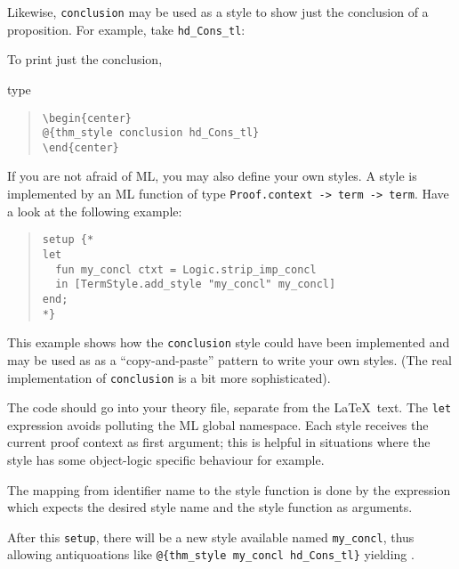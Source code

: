\begin{isabellebody}
\begin{isamarkuptext}
  Likewise, \verb!conclusion! may be used as a style to show just the
  conclusion of a proposition. For example, take \verb!hd_Cons_tl!:
  \begin{center}
  \end{center}
  To print just the conclusion,
  \begin{center}
  \end{center}
  type
  \begin{quote}
    \verb!\begin{center}!\\
    \verb!@!\verb!{thm_style conclusion hd_Cons_tl}!\\
    \verb!\end{center}!
  \end{quote}

  If you are not afraid of ML, you may also define your own styles.
  A style is implemented by an ML function of type
  \verb!Proof.context -> term -> term!.
  Have a look at the following example:%
\end{isamarkuptext}%
\isamarkuptrue%
\isamarkupfalse%
%
\begin{isamarkuptext}%
\begin{quote}
    \verb!setup {!\verb!*!\\
    \verb!let!\\
    \verb!  fun my_concl ctxt = Logic.strip_imp_concl!\\
    \verb!  in [TermStyle.add_style "my_concl" my_concl]!\\
    \verb!end;!\\
    \verb!*!\verb!}!\\
  \end{quote}

  \noindent
  This example shows how the \verb!conclusion! style could have been implemented
  and may be used as as a ``copy-and-paste'' pattern to write your own styles.
  (The real implementation of \verb!conclusion! is a bit more sophisticated).

  The code should go into your theory file, separate from the \LaTeX\ text.
  The \verb!let! expression avoids polluting the
  ML global namespace. Each style receives the current proof context
  as first argument; this is helpful in situations where the
  style has some object-logic specific behaviour for example.

  The mapping from identifier name to the style function
  is done by the  expression which expects the desired
  style name and the style function as arguments.
  
  After this \verb!setup!,
  there will be a new style available named \verb!my_concl!, thus allowing
  antiquoations like \verb!@!\verb!{thm_style my_concl hd_Cons_tl}!
  yielding .%
\end{isamarkuptext}%
\isamarkuptrue%
\isamarkupfalse%
\end{isabellebody}%
